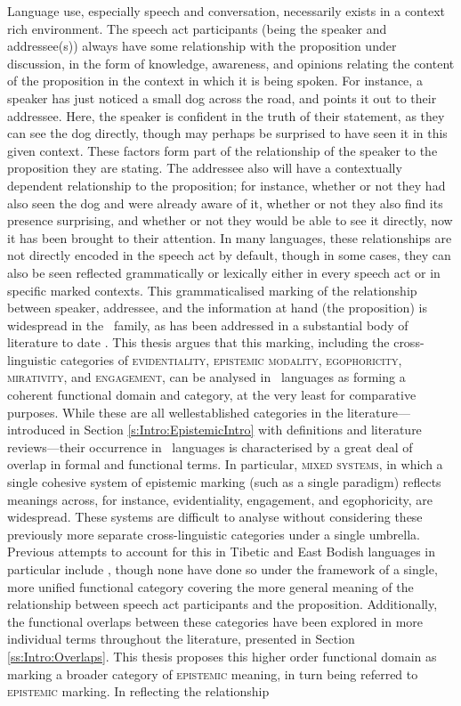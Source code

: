 Language use, especially speech and conversation, necessarily exists in a context rich environment. The speech act participants (being the speaker and addressee(s)) always have some relationship with the proposition under discussion, in the form of knowledge, awareness, and opinions relating the content of the proposition in the context in which it is being spoken. For instance, a speaker has just noticed a small dog across the road, and points it out to their addressee. Here, the speaker is confident in the truth of their statement, as they can see the dog directly, though may perhaps be surprised to have seen it in this given context. These factors form part of the relationship of the speaker to the proposition they are stating. The addressee also will have a contextually dependent relationship to the proposition; for instance, whether or not they had also seen the dog and were already aware of it, whether or not they also find its presence surprising, and whether or not they would be able to see it directly, now it has been brought to their attention. In many languages, these relationships are not directly encoded in the speech act by default, though in some cases, they can also be seen reflected grammatically or lexically either in every speech act or in specific marked contexts. This grammaticalised marking of the relationship between speaker, addressee, and the information at hand (the proposition) is widespread in the \lfam\ family, as has been addressed in a substantial body of literature to date \cites{Aikhenvald2004}{Hill2017}. This thesis argues that this marking, including the cross-linguistic categories of \textsc{evidentiality}, \textsc{epistemic modality}, \textsc{egophoricity}, \textsc{mirativity}, and \textsc{engagement}, can be analysed in \lfam\ languages as forming a coherent functional domain and category, at the very least for comparative purposes. While these are all wellestablished categories in the literature---introduced in Section \ref{s:Intro:EpistemicIntro} with definitions and literature reviews---their occurrence in \lfam\ languages is characterised by a great deal of overlap in formal and functional terms. In particular, \textsc{mixed systems}, in which a single cohesive system of epistemic marking (such as a single paradigm) reflects meanings across, for instance, evidentiality, engagement, and egophoricity, are widespread. These systems are difficult to analyse without considering these previously more separate cross-linguistic categories under a single umbrella. Previous attempts to account for this in Tibetic and East Bodish languages in particular include , though none have done so under the framework of a single, more unified functional category covering the more general meaning of the relationship between speech act participants and the proposition. Additionally, the functional overlaps between these categories have been explored in more individual terms throughout the literature, presented in Section \ref{ss:Intro:Overlaps}. This thesis proposes this higher order functional domain as marking a broader category of \textsc{epistemic} meaning, in turn being referred to \textsc{epistemic} marking. In reflecting the relationship 